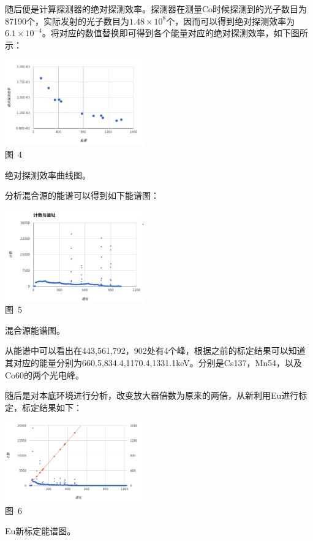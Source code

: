 \documentclass[a4paper,10.0pt,twoside]{npr}
\begin{document}
\begin{multicols}{2}
随后便是计算探测器的绝对探测效率。探测器在测量Co时候探测到的光子数目为87190个，实际发射的光子数目为$1.48\times 10^8$个，因而可以得到绝对探测效率为$6.1\times 10^{-4}$。将对应的数值替换即可得到各个能量对应的绝对探测效率，如下图所示：
\begin{center}
   \includegraphics[width=0.45\textwidth]{4.png}
\\
\xiaowu\song 图~4\begin{minipage}[t]{75mm} \quad 绝对探测效率曲线图。\\[-1mm]\wuhao
\end{minipage}
\end{center}

分析混合源的能谱可以得到如下能谱图：

\begin{center}
   \includegraphics[width=0.45\textwidth]{5.png}
\\
\xiaowu\song 图~5\begin{minipage}[t]{75mm} \quad 混合源能谱图。\\[-1mm]\wuhao
\end{minipage}
\end{center}

从能谱中可以看出在443,561,792，902处有4个峰，根据之前的标定结果可以知道其对应的能量分别为660.5,834.4,1170.4,1331.1keV。分别是Cs137，Mn54，以及Co60的两个光电峰。

随后是对本底环境进行分析，改变放大器倍数为原来的两倍，从新利用Eu进行标定，标定结果如下：

\begin{center}
   \includegraphics[width=0.45\textwidth]{6.png}
\\
\xiaowu\song 图~6\begin{minipage}[t]{75mm} \quad Eu新标定能谱图。\\[-1mm]\wuhao
\end{minipage}
\end{center}


\end{multicols}
\end{document}
